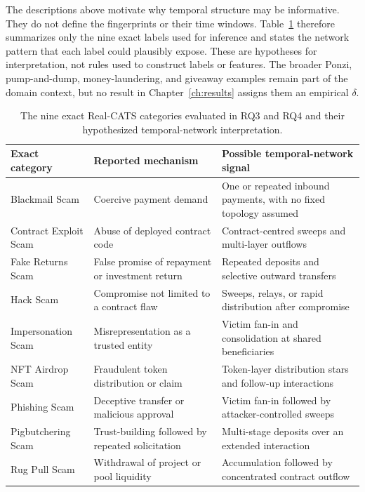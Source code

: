 \vspace{0.5em}
The descriptions above motivate why temporal structure may be informative. They do
not define the fingerprints or their time windows. Table~\ref{tab:scam_types}
therefore summarizes only the nine exact labels used for inference and states the
network pattern that each label could plausibly expose. These are hypotheses for
interpretation, not rules used to construct labels or features. The broader Ponzi,
pump-and-dump, money-laundering, and giveaway examples remain part of the domain
context, but no result in Chapter~\ref{ch:results} assigns them an empirical
$\delta$.

\begin{table}[htbp]
\centering
\caption{The nine exact Real-CATS categories evaluated in RQ3 and RQ4 and their
hypothesized temporal-network interpretation.}
\label{tab:scam_types}
\footnotesize
\begin{tabular}{p{3.4cm} p{4.5cm} p{5.1cm}}
\toprule
\textbf{Exact category} & \textbf{Reported mechanism} & \textbf{Possible temporal-network signal} \\
\midrule
Blackmail Scam & Coercive payment demand & One or repeated inbound payments, with no fixed topology assumed \\
Contract Exploit Scam & Abuse of deployed contract code & Contract-centred sweeps and multi-layer outflows \\
Fake Returns Scam & False promise of repayment or investment return & Repeated deposits and selective outward transfers \\
Hack Scam & Compromise not limited to a contract flaw & Sweeps, relays, or rapid distribution after compromise \\
Impersonation Scam & Misrepresentation as a trusted entity & Victim fan-in and consolidation at shared beneficiaries \\
NFT Airdrop Scam & Fraudulent token distribution or claim & Token-layer distribution stars and follow-up interactions \\
Phishing Scam & Deceptive transfer or malicious approval & Victim fan-in followed by attacker-controlled sweeps \\
Pigbutchering Scam & Trust-building followed by repeated solicitation & Multi-stage deposits over an extended interaction \\
Rug Pull Scam & Withdrawal of project or pool liquidity & Accumulation followed by concentrated contract outflow \\
\bottomrule
\end{tabular}
\end{table}

